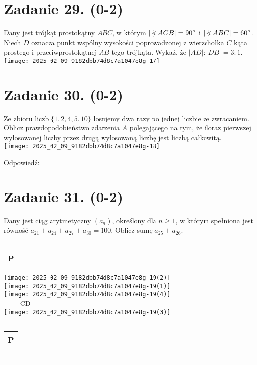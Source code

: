 \documentclass[10pt]{article}
\newcommand\Varangle{\mathop{{<\!\!\!\!\!\text{\small)}}\:}\nolimits}
\begin{document}
\section*{Zadanie 29. (0-2)}
Dany jest trójkąt prostokątny \(A B C\), w którym \(|\Varangle A C B|=90^{\circ}\) i \(|\Varangle A B C|=60^{\circ}\). Niech \(D\) oznacza punkt wspólny wysokości poprowadzonej z wierzchołka \(C\) kąta prostego i przeciwprostokątnej \(A B\) tego trójkąta. Wykaż, że \(|A D|:|D B|=3: 1\).\\
\texttt{[image: 2025\_02\_09\_9182dbb74d8c7a1047e8g-17]}

\section*{Zadanie 30. (0-2)}
Ze zbioru liczb \(\{1,2,4,5,10\}\) losujemy dwa razy po jednej liczbie ze zwracaniem. Oblicz prawdopodobieństwo zdarzenia \(A\) polegającego na tym, że iloraz pierwszej wylosowanej liczby przez drugą wylosowaną liczbę jest liczbą całkowitą.\\
\texttt{[image: 2025\_02\_09\_9182dbb74d8c7a1047e8g-18]}

Odpowiedź:

\section*{Zadanie 31. (0-2)}
Dany jest ciąg arytmetyczny \(\left(a_{n}\right)\), określony dla \(n \geq 1\), w którym spełniona jest równość \(a_{21}+a_{24}+a_{27}+a_{30}=100\). Oblicz sumę \(a_{25}+a_{26}\).

\(\qquad\) \begin{tabular}{l}
P \\
\hline
\end{tabular}

\(\qquad\)\\
\texttt{[image: 2025\_02\_09\_9182dbb74d8c7a1047e8g-19(2)]}\\
\texttt{[image: 2025\_02\_09\_9182dbb74d8c7a1047e8g-19(1)]}\\
\texttt{[image: 2025\_02\_09\_9182dbb74d8c7a1047e8g-19(4)]}\\
\(\qquad\) CD - \(\quad\) - \(\quad\) -\\
\texttt{[image: 2025\_02\_09\_9182dbb74d8c7a1047e8g-19(3)]}

\(\qquad\) \begin{tabular}{l}
P \\
\hline
\end{tabular} -
\end{document}
